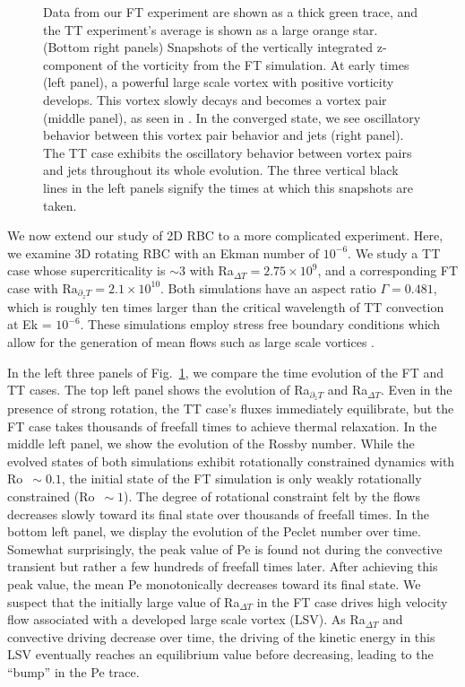 \documentclass[aps, pre, onecolumn, nofootinbib, notitlepage, groupedaddress, amsfonts, amssymb, amsmath, longbibliography, superscriptaddress]{revtex4-1}
\begin{document}
\begin{figure}
{	Data from our FT experiment are shown as a thick green trace, and the TT experiment's average is shown as a large orange star.
	(Bottom right panels) Snapshots of the vertically integrated z-component of the vorticity from the FT simulation.
	At early times (left panel), a powerful large scale vortex with positive vorticity develops.
	This vortex slowly decays and becomes a vortex pair (middle panel), as seen in \cite{stellmach&all2014}.
	In the converged state, we see oscillatory behavior between this vortex pair behavior and jets (right panel).
	The TT case exhibits the oscillatory behavior between vortex pairs and jets throughout its whole evolution.
	The three vertical black lines in the left panels signify the times at which this snapshots are taken.
\label{fig:rotating_panels} }
\end{figure}



We now extend our study of 2D RBC to a more complicated experiment.
Here, we examine 3D rotating RBC with an Ekman number of $10^{-6}$.
We study a TT case whose supercriticality is $\sim 3$ with Ra$_{\Delta T} = 2.75\times 10^9$, and a corresponding FT case with $\text{Ra}_{\partial_z T} = 2.1 \times 10^{10}$.
Both simulations have an aspect ratio $\Gamma = 0.481$, which is roughly ten times larger than the critical wavelength of TT convection at Ek = $10^{-6}$.
These simulations employ stress free boundary conditions which allow for the generation of mean flows such as large scale vortices \cite{couston&all2019}.

In the left three panels of Fig.~\ref{fig:rotating_panels}, we compare the time evolution of the FT and TT cases.
The top left panel shows the evolution of Ra$_{\partial_z T}$ and Ra$_{\Delta T}$.
Even in the presence of strong rotation, the TT case's fluxes immediately equilibrate, but the FT case takes thousands of freefall times to achieve thermal relaxation.
In the middle left panel, we show the evolution of the Rossby number.
While the evolved states of both simulations exhibit rotationally constrained dynamics with Ro $\,\sim 0.1$, the initial state of the FT simulation is only weakly rotationally constrained (Ro $\,\sim 1$).
The degree of rotational constraint felt by the flows decreases slowly toward its final state over thousands of freefall times.
In the bottom left panel, we display the evolution of the Peclet number over time.
Somewhat surprisingly, the peak value of Pe is found not during the convective transient but rather a few hundreds of freefall times later.
After achieving this peak value, the mean Pe monotonically decreases toward its final state.
We suspect that the initially large value of Ra$_{\Delta T}$ in the FT case drives high velocity flow associated with a developed large scale vortex (LSV).
As Ra$_{\Delta T}$ and convective driving decrease over time, the driving of the kinetic energy in this LSV eventually reaches an equilibrium value before decreasing, leading to the ``bump'' in the Pe trace.
\end{document}
